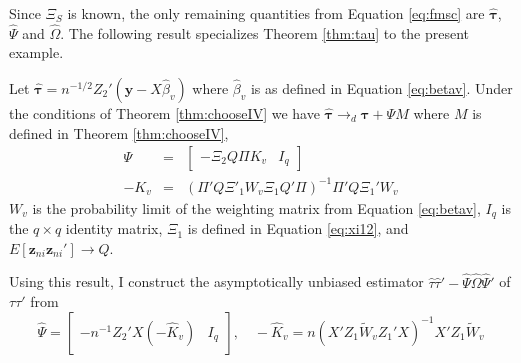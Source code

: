 Since $\Xi_S$ is known, the only remaining quantities from Equation \ref{eq:fmsc} are $\widehat{\boldsymbol{\tau}}$, $\widehat{\Psi}$ and $\widehat{\Omega}$. 
The following result specializes Theorem \ref{thm:tau} to the present example.
\begin{thm}
Let $\widehat{\boldsymbol{\tau}} = n^{-1/2} Z_2' ( \mathbf{y} - X\widehat{\beta}_v)$ where $\widehat{\beta}_v$ is as defined in Equation \ref{eq:betav}. Under the conditions of Theorem \ref{thm:chooseIV} we have
$\widehat{\boldsymbol{\tau}} \rightarrow_d \boldsymbol{\tau} + \Psi M$
where $M$ is defined in Theorem \ref{thm:chooseIV},
\begin{eqnarray*}
	\Psi &=&\left[ \begin{array}{cc}-\Xi_2Q \Pi K_v  & I_{q} \end{array}\right] \\
	-K_v &=& \left(\Pi' Q \Xi'_1 W_v \Xi_1 Q'\Pi\right)^{-1} \Pi'Q \Xi_1' W_v
\end{eqnarray*}
$W_v$ is the probability limit of the weighting matrix from Equation \ref{eq:betav}, $I_q$ is the $q\times q$ identity matrix, $\Xi_1$ is defined in Equation \ref{eq:xi12}, and $E[\mathbf{z}_{ni} \mathbf{z}_{ni}'] \rightarrow Q$. 
\end{thm}
Using this result, I construct the asymptotically unbiased estimator $\widehat{\tau}\widehat{\tau}' - \widehat{\Psi}\widehat{\Omega} \widehat{\Psi}'$ of $\tau\tau'$ from
	$$\widehat{\Psi} = \left[ \begin{array}
		{cc}
		-n^{-1}Z_2'X \left(-\widehat{K}_v\right) & I_q
	\end{array}\right], \quad -\widehat{K}_v = n\left(X'Z_1 \widetilde{W}_v Z_1' X\right)^{-1}X'Z_1 \widetilde{W}_v$$

